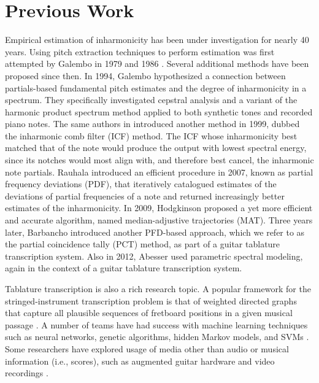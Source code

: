 \documentclass[convention,peer-reviewed]{aesconf}
\begin{document}
\section{Previous Work}

Empirical estimation of inharmonicity has been under investigation for nearly 40 years. Using pitch extraction techniques to perform estimation was first attempted by Galembo in 1979 and 1986 \citep{galembo1979,galembo1987}. Several additional methods have been proposed since then. In 1994, Galembo \citep{galembo1994} hypothesized a connection between partials-based fundamental pitch estimates and the degree of inharmonicity in a spectrum. They specifically investigated cepstral analysis and a variant of the harmonic product spectrum method applied to both synthetic tones and recorded piano notes. The same authors in \citep{galembo1999} introduced another method in 1999, dubbed the inharmonic comb filter (ICF) method. The ICF whose inharmonicity best matched that of the note would produce the output with lowest spectral energy, since its notches would most align with, and therefore best cancel, the inharmonic note partials. Rauhala \citep{rauhala2007} introduced an efficient procedure in 2007, known as partial frequency deviations (PDF), that iteratively catalogued estimates of the deviations of partial frequencies of a note and returned increasingly better estimates of the inharmonicity. In 2009, Hodgkinson \citep{hodgkinson2009} proposed a yet more efficient and accurate algorithm, named median-adjustive trajectories (MAT). Three years later, Barbancho \citep{barbanchoi2012} introduced another PFD-based approach, which we refer to as the partial coincidence tally (PCT) method, as part of a guitar tablature transcription system. Also in 2012, Abesser \citep{abesser2012} used parametric spectral modeling, again in the context of a guitar tablature transcription system.

Tablature transcription is also a rich research topic. A popular framework for the stringed-instrument transcription problem is that of weighted directed graphs that capture all plausible sequences of fretboard positions in a given musical passage \citep{sayegh1989,radicioni2005,yazawa2013,burlet2013,burlet2015,radisav2004}. A number of teams have had success with machine learning techniques such as neural networks, genetic algorithms, hidden Markov models, and SVMs  \citep{gagnon2003,tuohy2006,barbancho2009,barbanchoa2012,abesser2012,kehling2014,dittmar2013,abesser2012}. Some researchers have explored usage of media other than audio or musical information (i.e., scores), such as augmented guitar hardware and video recordings \citep{ogrady2009,paleari2008,kerd2007}.
\end{document}
